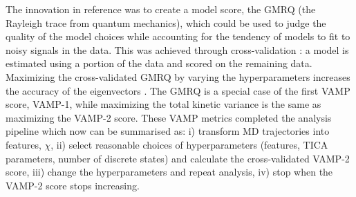 The innovation in reference \cite{mcgibbonVariationalCrossvalidationSlow2015} was to create a model score, the GMRQ (the Rayleigh trace from quantum mechanics), which could be used to judge the quality of the model choices while accounting for the tendency of models to fit to noisy signals in the data. This was achieved through cross-validation \cite{arlotSurveyCrossvalidationProcedures2009}: a model is estimated using a portion of the data and scored on the remaining data. Maximizing the cross-validated GMRQ by varying the hyperparameters increases the accuracy of the eigenvectors \cite{mcgibbonVariationalCrossvalidationSlow2015}. The GMRQ is a special case of the first VAMP score, VAMP-1, while maximizing the total kinetic variance is the same as maximizing the VAMP-2 score. These VAMP metrics completed the analysis pipeline \cite{schererVariationalSelectionFeatures2019} which now can be summarised as: i) transform MD trajectories into features, $\chi$, ii) select reasonable choices of  hyperparameters (features, TICA parameters, number of discrete states) and calculate the cross-validated VAMP-2 score, iii) change the hyperparameters and repeat analysis, iv) stop when the VAMP-2 score stops increasing. 

